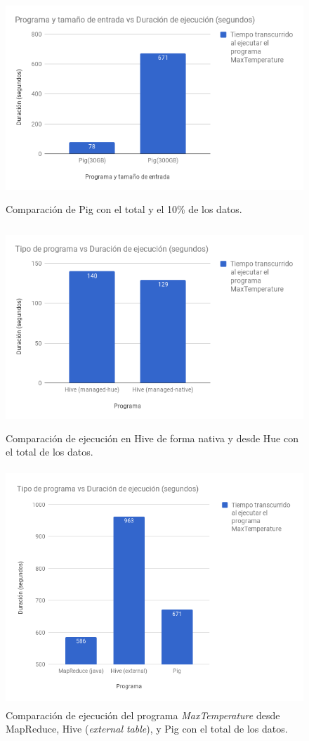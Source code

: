 \begin{figure}[H]
  \centering
      \includegraphics[width=\textwidth, height=3.0in]{fig/07/01_02}
  \caption{Comparación de Pig con el total y el 10\% de los datos.}
  \label{07_01_02}
\end{figure}

\begin{figure}[H]
  \centering
      \includegraphics[width=\textwidth, height=3.0in]{fig/07/01_03}
  \caption{Comparación de ejecución en Hive de forma nativa y desde Hue con el total de los datos.}
  \label{07_01_03}
\end{figure}

\begin{figure}[H]
  \centering
      \includegraphics[width=\textwidth, height=3.5in]{fig/07/01_04}
  \caption{Comparación de ejecución del programa \textit{MaxTemperature} desde MapReduce, Hive (\textit{external table}), y Pig con el total de los datos.}
  \label{07_01_04}
\end{figure}

